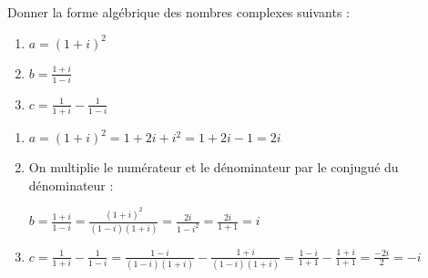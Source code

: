 
%
Donner la forme algébrique des nombres complexes suivants :
\begin{enumerate}
     \item
     $a=\left(1+i\right)^{2}$
     \item
     $b=\frac{1+i}{1-i}$
     \item
     $c=\frac{1}{1+i}-\frac{1}{1-i}$
\end{enumerate}
\begin{corrige}
     \begin{enumerate}
          \item
          $a=\left(1+i\right)^{2}=1+2i+i^{2}=1+2i-1=2i$
          \item
          On multiplie le numérateur et le dénominateur par le conjugué du dénominateur :
          \par
          $b=\frac{1+i}{1-i}=\frac{\left(1+i\right)^{2}}{\left(1-i\right)\left(1+i\right)}=\frac{2i}{1-i^{2}}=\frac{2i}{1+1}=i$
          \item
     $c=\frac{1}{1+i}-\frac{1}{1-i} $\nosp$=\frac{1-i}{\left(1-i\right)\left(1+i\right)}-\frac{1+i}{\left(1-i\right)\left(1+i\right)} $\nosp$  =\frac{1-i}{1+1}-\frac{1+i}{1+1} $\nosp$=\frac{-2i}{2}=-i$
     \end{enumerate}
\end{corrige}
